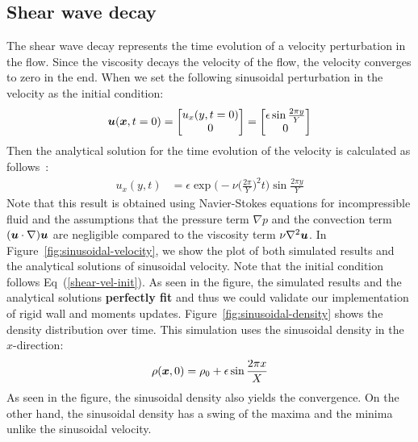 \subsection{Shear wave decay}
The shear wave decay represents the time evolution of a
velocity perturbation in the flow.
Since the viscosity decays the velocity of the flow,
the velocity converges to zero in the end.
When we set the following sinusoidal perturbation in the velocity
as the initial condition:
\begin{equation}
  \begin{aligned}
    \boldsymbol{u}(\boldsymbol{x}, t = 0) =
    \begin{bmatrix}
      u_x(y, t = 0) \\
      0 \\
    \end{bmatrix}
    =  
    \begin{bmatrix}
      \epsilon \sin \frac{2\pi y}{Y} \\
        0 \\
      \end{bmatrix}
  \end{aligned}
  \label{shear-vel-init}
\end{equation}
Then the analytical solution for the time evolution of 
the velocity is calculated as follows~\cite{fei2018three}:
\begin{equation}
  \begin{aligned}
    u_x(y, t) &= 
    \epsilon \exp\biggl(
      -\nu \biggl(
        \frac{2\pi}{Y}
      \biggr)^2 t\biggr) \sin \frac{2\pi y}{Y}
  \end{aligned}
  \label{sinusoidal-vel-analytical-solution}
\end{equation}
Note that this result is obtained using Navier-Stokes equations for incompressible fluid
and the assumptions that the pressure term $\nabla p$ and
the convection term $(\boldsymbol{u} \cdot \nabla) \boldsymbol{u}$ are negligible 
compared to the viscosity term $\nu \nabla^2 \boldsymbol{u}$.
In Figure~\ref{fig:sinusoidal-velocity}, we show the plot of both
simulated results and the analytical solutions of sinusoidal velocity.
Note that the initial condition follows Eq~(\ref{shear-vel-init}). 
As seen in the figure, the simulated results and the analytical solutions
{\bf perfectly fit} and thus we could validate our implementation of
rigid wall and moments updates.
Figure~\ref{fig:sinusoidal-density} shows the density distribution
over time.
This simulation uses the sinusoidal density in the $x$-direction:
\begin{equation}
\begin{aligned}
  \rho(\boldsymbol{x}, 0) = \rho_0 + \epsilon \sin \frac{2 \pi x}{X}
\end{aligned}
\label{sinusoidal-density-init}
\end{equation}
As seen in the figure, the sinusoidal density also
yields the convergence.
On the other hand, the sinusoidal density has
a swing of the maxima and the minima unlike the sinusoidal velocity.

